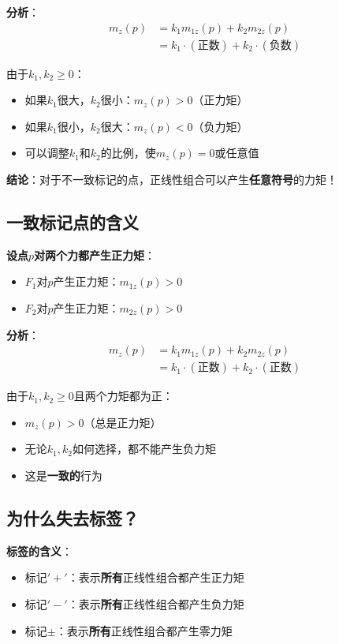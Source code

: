 \documentclass[12pt,a4paper]{article}
\begin{document}
\textbf{分析}：
\begin{align}
m_z(p) &= k_1 m_{1z}(p) + k_2 m_{2z}(p) \\
&= k_1 \cdot (\text{正数}) + k_2 \cdot (\text{负数})
\end{align}

由于$k_1, k_2 \geq 0$：
\begin{itemize}
\item 如果$k_1$很大，$k_2$很小：$m_z(p) > 0$（正力矩）
\item 如果$k_1$很小，$k_2$很大：$m_z(p) < 0$（负力矩）
\item 可以调整$k_1$和$k_2$的比例，使$m_z(p) = 0$或任意值
\end{itemize}

\textbf{结论}：对于不一致标记的点，正线性组合可以产生\textbf{任意符号}的力矩！

\subsection{一致标记点的含义}

\textbf{设点$p$对两个力都产生正力矩}：
\begin{itemize}
\item $F_1$对$p$产生正力矩：$m_{1z}(p) > 0$
\item $F_2$对$p$产生正力矩：$m_{2z}(p) > 0$
\end{itemize}

\textbf{分析}：
\begin{align}
m_z(p) &= k_1 m_{1z}(p) + k_2 m_{2z}(p) \\
&= k_1 \cdot (\text{正数}) + k_2 \cdot (\text{正数})
\end{align}

由于$k_1, k_2 \geq 0$且两个力矩都为正：
\begin{itemize}
\item $m_z(p) > 0$（总是正力矩）
\item 无论$k_1, k_2$如何选择，都不能产生负力矩
\item 这是\textbf{一致的}行为
\end{itemize}

\subsection{为什么失去标签？}

\textbf{标签的含义}：
\begin{itemize}
\item 标记$'+'$：表示\textbf{所有}正线性组合都产生正力矩
\item 标记$'-'$：表示\textbf{所有}正线性组合都产生负力矩
\item 标记$\pm$：表示\textbf{所有}正线性组合都产生零力矩
\end{itemize}
\end{document}
